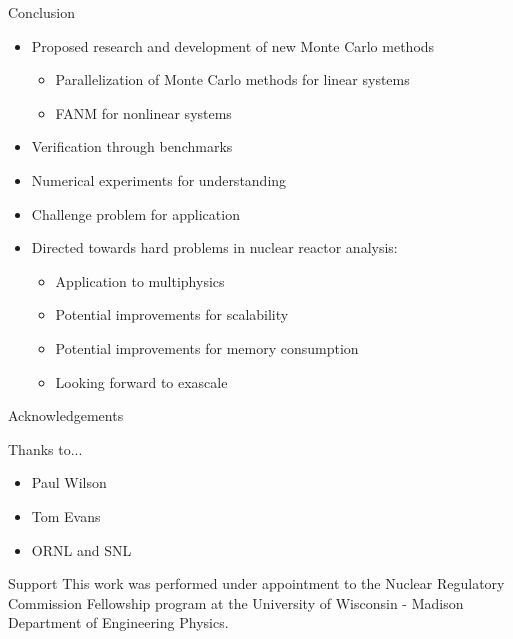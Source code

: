 \documentclass{beamer}
\begin{document}
\begin{frame}{Conclusion}

  \begin{itemize}
  \item Proposed research and development of new Monte Carlo methods
    \begin{itemize}
    \item Parallelization of Monte Carlo methods for linear systems
    \item FANM for nonlinear systems
    \end{itemize}
    \medskip
  \item Verification through benchmarks
    \medskip
  \item Numerical experiments for understanding
    \medskip
  \item Challenge problem for application
    \medskip
  \item Directed towards hard problems in nuclear reactor analysis:
    \begin{itemize}
    \item Application to multiphysics
    \item Potential improvements for scalability
    \item Potential improvements for memory consumption
    \item Looking forward to exascale
    \end{itemize}
  \end{itemize}

\end{frame}

\begin{frame}{Acknowledgements}

  Thanks to...

  \begin{itemize}
  \item Paul Wilson
  \item Tom Evans
  \item ORNL and SNL
  \end{itemize}

  \medskip \medskip \medskip \medskip \medskip \medskip \medskip

  \begin{beamerboxesrounded}[upper=boxheadcolor,lower=boxbodycolor,shadow=true]
    {Support} 
    This work was performed under appointment to the Nuclear Regulatory
    Commission Fellowship program at the University of Wisconsin - Madison
    Department of Engineering Physics.
  \end{beamerboxesrounded}

\end{frame}

\end{document}
